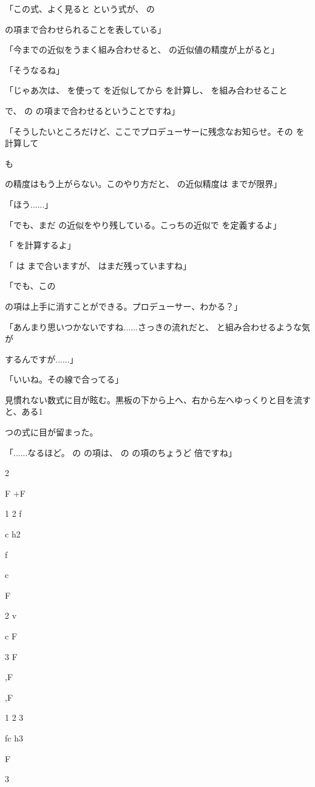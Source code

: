 「この式、よく⾒ると という式が、 の\par
の項まで合わせられることを表している」\par
「今までの近似をうまく組み合わせると、 の近似値の精度が上がると」\par
「そうなるね」\par
「じゃあ次は、 を使って を近似してから を計算し、 を組み合わせること\par
で、 の の項まで合わせるということですね」\par
「そうしたいところだけど、ここでプロデューサーに残念なお知らせ。その を計算して\par
も\par
の精度はもう上がらない。このやり⽅だと、 の近似精度は までが限界」\par
「ほう......」\par
「でも、まだ の近似をやり残している。こっちの近似で を定義するよ」\par
「 を計算するよ」\par
「 は まで合いますが、 はまだ残っていますね」\par
「でも、この\par
の項は上⼿に消すことができる。プロデューサー、わかる？」\par
「あんまり思いつかないですね......さっきの流れだと、 と組み合わせるような気が\par
するんですが......」\par
「いいね。その線で合ってる」\par
⾒慣れない数式に⽬が眩む。黒板の下から上へ、右から左へゆっくりと⽬を流すと、ある1\par
つの式に⽬が留まった。\par
「......なるほど。 の の項は、 の の項のちょうど 倍ですね」\par
2\par
F  +F\par
1 2 f\par
c h2\par
f\par
c\par
F\par
2 v\par
c F\par
3 F\par
,F\par
,F\par
1 2 3\par
fc h3\par
F\par
3\par
